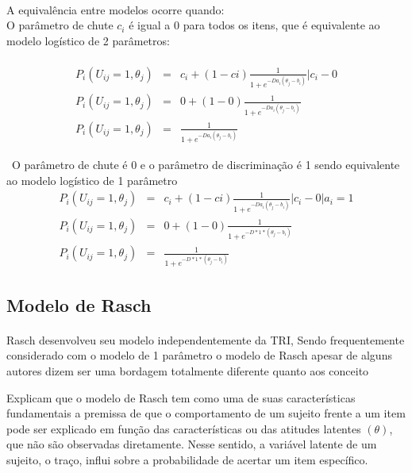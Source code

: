 	\paragraph{}
    	\noindent A equivalência entre modelos ocorre quando:\\
    	O parâmetro de chute $c_i$ é igual a $0$ para todos os itens, que é equivalente ao modelo logístico de 2 parâmetros:
    \paragraph{}
	\begin{eqnarray}
		P_i(U_{ij} = 1,\theta_j) & = & c_i + (1-ci)\displaystyle\frac{1}{1 + e^{-Da_i(\theta_j - b_i)}} | c_i - 0 \nonumber \\ 
		P_i(U_{ij} = 1,\theta_j) & = & 0 + (1-0)\displaystyle\frac{1}{1 + e^{-Da_i(\theta_j - b_i)}} \nonumber \\
		P_i(U_{ij} = 1,\theta_j) & = & \displaystyle\frac{1}{1 + e^{-Da_i(\theta_j - b_i)}} \nonumber
	\end{eqnarray}
    	
    	\
    \noindent O parâmetro de chute é 0 e o parâmetro de discriminação é 1 sendo equivalente ao modelo logístico de 1 parâmetro\\
	
	\begin{eqnarray}
		P_i(U_{ij} = 1,\theta_j) & = & c_i + (1-ci)\displaystyle\frac{1}{1 + e^{-Da_i(\theta_j - b_i)}} | c_i - 0 | a_i = 1\\
		P_i(U_{ij} = 1,\theta_j) & = & 0 + (1-0)\displaystyle\frac{1}{1 + e^{-D*1*(\theta_j - b_i)}} \\
		P_i(U_{ij} = 1,\theta_j) & = & \displaystyle\frac{1}{1 + e^{-D*1*(\theta_j - b_i)}}
	\end{eqnarray}
    	
    \subsection{Modelo de Rasch}
    \paragraph{}
    	Rasch desenvolveu seu modelo independentemente da TRI, Sendo frequentemente considerado com o modelo de 1 parâmetro o modelo de Rasch apesar de alguns autores dizem ser uma bordagem totalmente diferente quanto aos conceito
    	\par
    	    Explicam que o modelo de Rasch tem como uma de suas características fundamentais a premissa de que o comportamento de um sujeito frente a um item pode ser explicado em função das características ou das atitudes
    	latentes $(\theta)$, que não são observadas diretamente. Nesse sentido, a variável latente de um sujeito, o traço, influi sobre a probabilidade de acertar um item específico.

